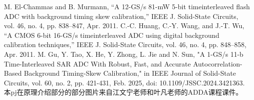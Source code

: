 \documentclass[cs4size,a4paper]{ctexart}
\numberwithin{equation}{section}
\numberwithin{table}{section}
\numberwithin{figure}{section}
\begin{document}
		
\clearpage

%
\begin{thebibliography}{100}
 M. El-Chammas and B. Murmann, “A 12-GS/s 81-mW 5-bit timeinterleaved flash ADC with background timing skew calibration,” IEEE J. Solid-State Circuits, vol. 46, no. 4, pp. 838–847, Apr. 2011.
 C.-C. Huang, C.-Y. Wang, and J.-T. Wu, “A CMOS 6-bit 16-GS/s timeinterleaved ADC using digital background calibration techniques,” IEEE J. Solid-State Circuits, vol. 46, no. 4, pp. 848–858, Apr. 2011.
 M. Gu, Y. Tao, X. He, Y. Zhong, L. Jie and N. Sun, "A 1-GS/s 11-b Time-Interleaved SAR ADC With Robust, Fast, and Accurate Autocorrelation-Based Background Timing-Skew Calibration," in IEEE Journal of Solid-State Circuits, vol. 60, no. 2, pp. 421-431, Feb. 2025, doi: 10.1109/JSSC.2024.3421363.
 本pj在原理介绍部分的部分图片来自江文宁老师和叶凡老师的ADDA课程课件。
\end{thebibliography}
\clearpage
% 
%
\end{document}
